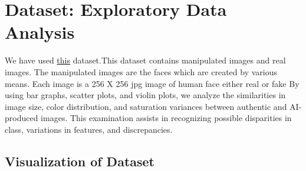 \documentclass[10pt,twocolumn,letterpaper]{article}
\begin{document}
\section{Dataset: Exploratory Data Analysis}
We have used \href{https://www.kaggle.com/datasets/manjilkarki/deepfake-and-real-images}{this} dataset.This dataset contains manipulated images and real images. The manipulated images are the faces which are created by various means. Each image is a 256 X 256 jpg image of human face either real or fake
By using bar graphs, scatter plots, and violin plots, we analyze the similarities in image size, color distribution, and saturation variances between authentic and AI-produced images. 
This examination assists in recognizing possible disparities in class, variations in features, and discrepancies.
\subsection{Visualization of Dataset}
\end{document}
